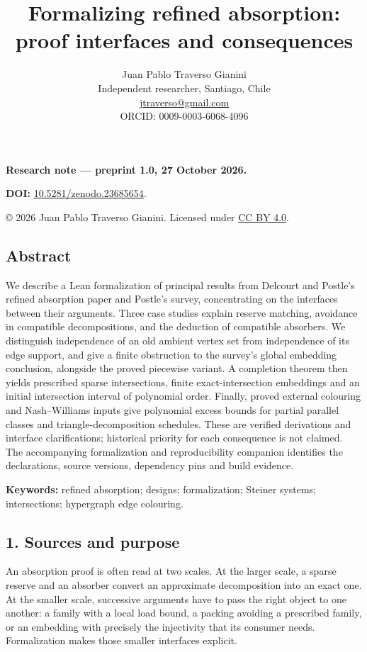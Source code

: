 \documentclass[english,11pt,a4paper]{article}
\title{Formalizing refined absorption: proof interfaces and consequences}
\author{Juan Pablo Traverso Gianini\\
\small Independent researcher, Santiago, Chile\\
\small \href{mailto:jtraverso@gmail.com}{jtraverso@gmail.com}\\
\small ORCID: 0009-0003-6068-4096}
\date{}
\begin{document}
\raggedbottom
{}
\makeatletter
{}
\makeatother
\maketitle
\textbf{Research note --- preprint 1.0, 27 October 2026.}

\textbf{DOI:} \href{https://doi.org/10.5281/zenodo.23685654}{10.5281/zenodo.23685654}.

© 2026 Juan Pablo Traverso Gianini. Licensed under \href{https://creativecommons.org/licenses/by/4.0/}{CC BY 4.0}.

\subsection{Abstract}\label{abstract}

We describe a Lean formalization of principal results from Delcourt and Postle's refined absorption paper and Postle's survey, concentrating on the interfaces between their arguments. Three case studies explain reserve matching, avoidance in compatible decompositions, and the deduction of compatible absorbers. We distinguish independence of an old ambient vertex set from independence of its edge support, and give a finite obstruction to the survey's global embedding conclusion, alongside the proved piecewise variant. A completion theorem then yields prescribed sparse intersections, finite exact-intersection embeddings and an initial intersection interval of polynomial order. Finally, proved external colouring and Nash--Williams inputs give polynomial excess bounds for partial parallel classes and triangle-decomposition schedules. These are verified derivations and interface clarifications; historical priority for each consequence is not claimed. The accompanying formalization and reproducibility companion identifies the declarations, source versions, dependency pins and build evidence.

\textbf{Keywords:} refined absorption; designs; formalization; Steiner systems; intersections; hypergraph edge colouring.

\subsection{1. Sources and purpose}\label{sources-and-purpose}

An absorption proof is often read at two scales. At the larger scale, a sparse reserve and an absorber convert an approximate decomposition into an exact one. At the smaller scale, successive arguments have to pass the right object to one another: a family with a local load bound, a packing avoiding a prescribed family, or an embedding with precisely the injectivity that its consumer needs. Formalization makes those smaller interfaces explicit.
\end{document}
